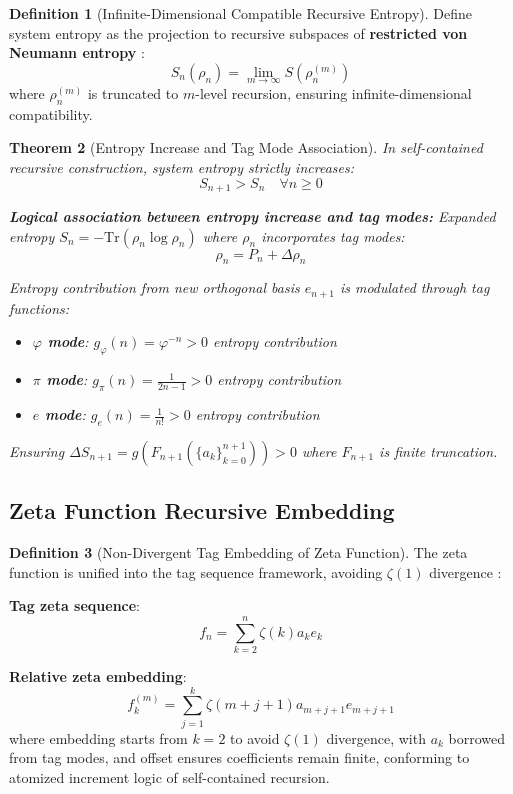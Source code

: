 \documentclass[12pt]{article}
\theoremstyle{plain}
\newtheorem{theorem}{Theorem}[section]
\theoremstyle{definition}
\newtheorem{definition}[theorem]{Definition}
\begin{document}
\begin{definition}[Infinite-Dimensional Compatible Recursive Entropy]
Define system entropy as the projection to recursive subspaces of \textbf{restricted von Neumann entropy} \cite{neumann1955}:
$$S_n(\rho_n) = \lim_{m \to \infty} S(\rho_n^{(m)})$$
where $\rho_n^{(m)}$ is truncated to $m$-level recursion, ensuring infinite-dimensional compatibility.
\end{definition}

\begin{theorem}[Entropy Increase and Tag Mode Association]
In self-contained recursive construction, system entropy strictly increases:
$$S_{n+1} > S_n \quad \forall n \geq 0$$

\textbf{Logical association between entropy increase and tag modes:}
Expanded entropy $S_n = -\text{Tr}(\rho_n \log \rho_n)$ where $\rho_n$ incorporates tag modes:
$$\rho_n = P_n + \Delta \rho_n$$

Entropy contribution from new orthogonal basis $e_{n+1}$ is modulated through tag functions:
\begin{itemize}
\item \textbf{$\varphi$ mode}: $g_\varphi(n) = \varphi^{-n} > 0$ entropy contribution
\item \textbf{$\pi$ mode}: $g_\pi(n) = \frac{1}{2n-1} > 0$ entropy contribution
\item \textbf{$e$ mode}: $g_e(n) = \frac{1}{n!} > 0$ entropy contribution
\end{itemize}
Ensuring $\Delta S_{n+1} = g(F_{n+1}(\{a_k\}_{k=0}^{n+1})) > 0$ where $F_{n+1}$ is finite truncation.
\end{theorem}

\subsection{Zeta Function Recursive Embedding}

\begin{definition}[Non-Divergent Tag Embedding of Zeta Function]
The zeta function is unified into the tag sequence framework, avoiding $\zeta(1)$ divergence \cite{titchmarsh1986}:

\textbf{Tag zeta sequence}:
$$f_n = \sum_{k=2}^n \zeta(k) a_k e_k$$

\textbf{Relative zeta embedding}:
$$f_k^{(m)} = \sum_{j=1}^k \zeta(m+j+1) a_{m+j+1} e_{m+j+1}$$
where embedding starts from $k=2$ to avoid $\zeta(1)$ divergence, with $a_k$ borrowed from tag modes, and offset ensures coefficients remain finite, conforming to atomized increment logic of self-contained recursion.
\end{definition}
\end{document}
